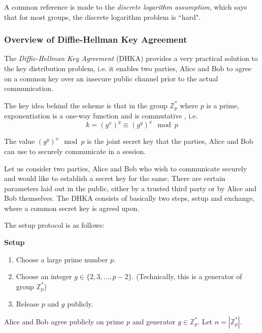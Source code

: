 A common reference is made to the \textit{discrete logarithm assumption}, which says that for most groups, the discrete logarithm problem is ``hard".
\subsubsection{Overview of Diffie-Hellman Key Agreement}

\label{subsec:dhka} 

The \emph{Diffie-Hellman Key Agreement} (DHKA) provides a very practical solution to the key distribution problem, i.e. it enables two parties, Alice and Bob to agree on a common key over an insecure public channel prior to the actual communication.

The key idea behind the scheme is that in the group \( \mathbb{Z}^*_p \) where \( p \) is a prime, exponentiation is a one-way function and is commutative \cite{paar2009understanding}, i.e.
\begin{equation}
    k = (g^x)^y \equiv (g^y)^x \mod p
\end{equation}

The value \( (g^y)^x \mod p \) is the joint secret key that the parties, Alice and Bob can use to securely communicate in a session.

Let us consider two parties, Alice and Bob who wish to communicate securely and would like to establish a secret key for the same. 
There are certain parameters laid out in the public, either by a trusted third party or by Alice and Bob themselves. 
The DHKA consists of basically two steps, setup and exchange, where a common secret key is agreed upon.

The setup protocol is as follows:

\begin{tcolorbox}
\textbf{Setup} 

\begin{enumerate}
    \item Choose a large prime number \( p \).
    \item Choose an integer \( g \in \{2, 3, \ldots , p-2\} \). (Technically, this is a generator of group \( \mathbb{Z}^*_p \))
    \item Release \( p \) and \( g \) publicly.
\end{enumerate}
\end{tcolorbox}

Alice and Bob agree publicly on prime \( p \) and generator \( g \in \mathbb{Z}^*_p \). 
Let \( n = |\mathbb{Z}^*_p| \).

